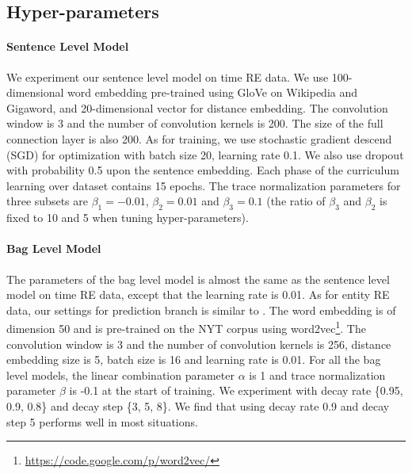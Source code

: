 \documentclass[11pt,a4paper]{article}
\begin{document}
\subsection{Hyper-parameters}
\paragraph{Sentence Level Model}
We experiment our sentence level model on time RE data. We use 100-dimensional word embedding pre-trained using GloVe \cite{pennington2014glove} on Wikipedia and Gigaword, and 20-dimensional vector for distance embedding. The convolution window is 3 and the number of convolution kernels is 200. The size of the full connection layer is also 200. As for training, we use stochastic gradient descend (SGD) for optimization with batch size 20, learning rate 0.1. We also use dropout with probability 0.5 upon the sentence embedding. Each phase of the curriculum learning over dataset contains 15 epochs. The trace normalization parameters for three subsets are $\beta_1=-0.01$, $\beta_2=0.01$ and $\beta_3=0.1$ (the ratio of $\beta_3$ and $\beta_2$ is fixed to 10 and 5 when tuning hyper-parameters).

\paragraph{Bag Level Model}
The parameters of the bag level model is almost the same as the sentence level model on time RE data, except that the learning rate is 0.01. As for entity RE data, our settings for prediction branch is similar to \cite{lin2016neural}. The word embedding is of dimension 50 and is pre-trained on the NYT corpus using word2vec\footnote{\url{ https://code.google.com/p/word2vec/}}. The convolution window is 3 and the number of convolution kernels is 256, distance embedding size is 5, batch size is 16 and learning rate is 0.01. For all the bag level models, the linear combination parameter $\alpha$ is 1 and trace normalization parameter $\beta$ is -0.1 at the start of training. We experiment with decay rate \{0.95, 0.9, 0.8\} and decay step \{3, 5, 8\}. We find that using decay rate 0.9 and decay step 5 performs well in most situations.
\end{document}
